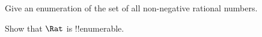 \documentclass[../../../include/open-logic-section]{subfiles}
\begin{document}
%
%
%
\begin{prob}
Give an enumeration of the set of all non-negative rational numbers. 
\end{prob}

\begin{prob}
Show that $\Rat$ is !!{enumerable}. %
\end{prob}
\end{document}
